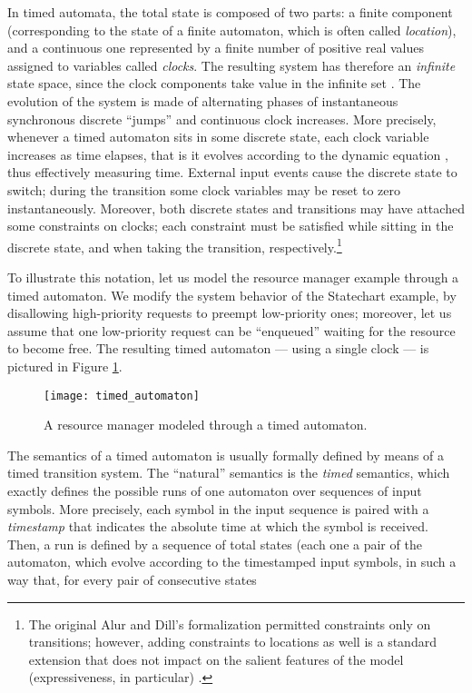 In timed automata, the total state is composed of two parts: 
a finite component (corresponding to the state of a finite automaton, 
which is often called \emph{location}), and a continuous one represented 
by a finite number of positive real values assigned to variables 
called \emph{clocks}. The resulting system has therefore an \emph{infinite} 
state space, since the clock components take value in the infinite 
set . The evolution of the system is made of alternating phases 
of instantaneous synchronous discrete ``jumps'' and continuous 
clock increases. More precisely, whenever a timed automaton sits 
in some discrete state, each clock variable  increases as 
time elapses, that is it evolves according to the dynamic equation , 
thus effectively measuring time. External input events cause 
the discrete state to switch; during the transition some clock 
variables may be reset to zero instantaneously. Moreover, both 
discrete states and transitions may have attached some constraints 
on clocks; each constraint must be satisfied while sitting in 
the discrete state, and when taking the transition, respectively.\footnote{The original Alur and Dill's formalization \cite{AD94} permitted constraints only on transitions; however, adding constraints to locations as well is a standard extension that does not impact on the salient features of the model (expressiveness, in particular) \cite{BY04}.}

To illustrate this notation, let us model the resource manager 
example through a timed automaton. We modify the system behavior 
of the Statechart example, by disallowing high-priority requests 
to preempt low-priority ones; moreover, let us assume that one 
low-priority request can be ``enqueued'' waiting for the resource 
to become free. The resulting timed automaton --- using a single 
clock  --- is pictured in Figure \ref{fig:timed_automaton}.
\begin{figure}[htb!]
	 \centering
	 \texttt{[image: timed\_automaton]}
	 \caption{A resource manager modeled through a timed automaton.}
	 \label{fig:timed_automaton}
\end{figure}

The semantics of a timed automaton is usually formally defined 
by means of a timed transition system. The ``natural'' semantics 
is the \emph{timed} semantics, which exactly defines the possible 
runs of one automaton over sequences of input symbols. More precisely, 
each symbol in the input sequence is paired with a \emph{timestamp} 
that indicates the absolute time at which the symbol is received. 
Then, a run is defined by a sequence of total states (each one 
a pair  of 
the automaton, which evolve according to the timestamped input 
symbols, in such a way that, for every pair of consecutive states

